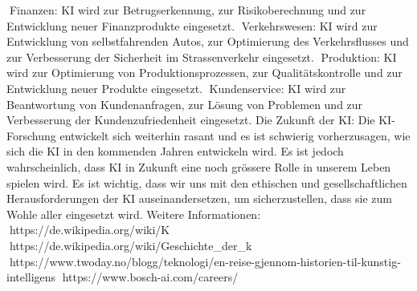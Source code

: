 Finanzen: KI wird zur Betrugserkennung, zur Risikoberechnung und zur Entwicklung neuer Finanzprodukte eingesetzt.
Verkehrswesen: KI wird zur Entwicklung von selbstfahrenden Autos, zur Optimierung des Verkehrsflusses und zur Verbesserung der Sicherheit im Strassenverkehr eingesetzt.
Produktion: KI wird zur Optimierung von Produktionsprozessen, zur Qualitätskontrolle und zur Entwicklung neuer Produkte eingesetzt.
Kundenservice: KI wird zur Beantwortung von Kundenanfragen, zur Lösung von Problemen und zur Verbesserung der Kundenzufriedenheit eingesetzt.
Die Zukunft der KI:
Die KI-Forschung entwickelt sich weiterhin rasant und es ist schwierig vorherzusagen, wie sich die KI in den kommenden Jahren entwickeln wird. Es ist jedoch wahrscheinlich, dass KI in Zukunft eine noch grössere Rolle in unserem Leben spielen wird. Es ist wichtig, dass wir uns mit den ethischen und gesellschaftlichen Herausforderungen der KI auseinandersetzen, um sicherzustellen, dass sie zum Wohle aller eingesetzt wird.
Weitere Informationen:
https://de.wikipedia.org/wiki/K%
https://de.wikipedia.org/wiki/Geschichte_der_k%
https://www.twoday.no/blogg/teknologi/en-reise-gjennom-historien-til-kunstig-intelligens
https://www.bosch-ai.com/careers/

